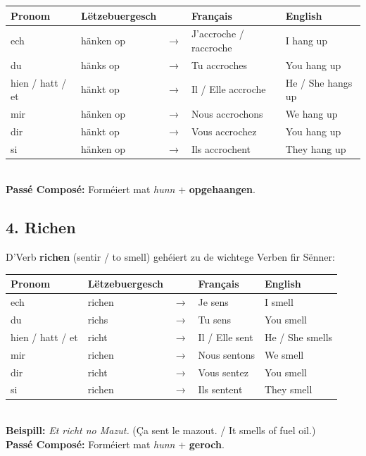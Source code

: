 \begin{tabular}{ll c l l}
    \toprule
    \textbf{Pronom} & \textbf{Lëtzebuergesch} & \textbf{} & \textbf{Français} & \textbf{English} \\
    \midrule
    ech & hänken op & $\rightarrow$ & J'accroche / raccroche & I hang up \\
    du & hänks op & $\rightarrow$ & Tu accroches & You hang up \\
    hien / hatt / et & hänkt op & $\rightarrow$ & Il / Elle accroche & He / She hangs up \\
    \midrule
    mir & hänken op & $\rightarrow$ & Nous accrochons & We hang up \\
    dir & hänkt op & $\rightarrow$ & Vous accrochez & You hang up \\
    si & hänken op & $\rightarrow$ & Ils accrochent & They hang up \\
    \bottomrule
\end{tabular}
\\[0.5em]
\textbf{Passé Composé:} Forméiert mat \textit{hunn} + \textbf{opgehaangen}.

\subsection*{4. Richen}
D'Verb \textbf{richen} (sentir / to smell) gehéiert zu de wichtege Verben fir Sënner:

\begin{tabular}{ll c l l}
    \toprule
    \textbf{Pronom} & \textbf{Lëtzebuergesch} & \textbf{} & \textbf{Français} & \textbf{English} \\
    \midrule
    ech & richen & $\rightarrow$ & Je sens & I smell \\
    du & richs & $\rightarrow$ & Tu sens & You smell \\
    hien / hatt / et & richt & $\rightarrow$ & Il / Elle sent & He / She smells \\
    \midrule
    mir & richen & $\rightarrow$ & Nous sentons & We smell \\
    dir & richt & $\rightarrow$ & Vous sentez & You smell \\
    si & richen & $\rightarrow$ & Ils sentent & They smell \\
    \bottomrule
\end{tabular}
\\[0.5em]
\textbf{Beispill:} \textit{Et richt no Mazut.} (Ça sent le mazout. / It smells of fuel oil.) \\
\textbf{Passé Composé:} Forméiert mat \textit{hunn} + \textbf{geroch}.

